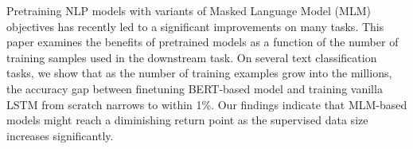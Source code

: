 Pretraining NLP models with variants of Masked Language Model (MLM) objectives  has recently led to a significant improvements on many tasks. This paper examines the benefits of pretrained models as a function of the number of training samples used in the downstream task. On several text classification tasks, we show that as the number of training examples grow into the millions, the accuracy gap between finetuning BERT-based model and training vanilla LSTM from scratch narrows to within 1\%. Our findings indicate that MLM-based models might reach a diminishing return point as the supervised data size increases significantly.
